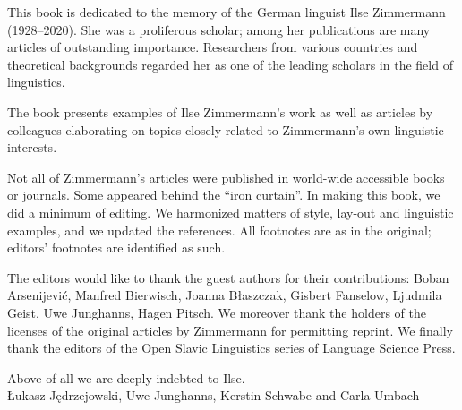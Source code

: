 
\noindent This book is dedicated to the memory of the German linguist Ilse Zimmermann (1928–2020). She was a proliferous scholar; among her publications are many articles of outstanding importance. Researchers from various countries and theoretical backgrounds regarded her as one of the leading scholars in the field of linguistics.

The book presents examples of Ilse Zimmermann’s work as well as articles by colleagues elaborating on topics closely related to Zimmermann’s own linguistic interests.

Not all of Zimmermann’s articles were published in world-wide accessible books or journals. Some appeared behind the “iron curtain”.  In making this book, we did a minimum of editing. We harmonized matters of style, lay-out and linguistic examples, and we updated the references. All footnotes are as in the original; editors’ footnotes are identified as such.

The editors would like to thank the guest authors for their contributions: Boban Arsenijević, Manfred Bierwisch, Joanna Błaszczak, Gisbert Fanselow, Ljudmila Geist, Uwe Junghanns, Hagen Pitsch. We moreover thank the holders of the licenses of the original articles by Zimmermann for permitting reprint. We finally thank the editors of the Open Slavic Linguistics series of Language Science Press.

Above of all we are deeply indebted to Ilse.\bigskip\\
\noindent Łukasz Jędrzejowski, Uwe Junghanns, Kerstin Schwabe and Carla Umbach
